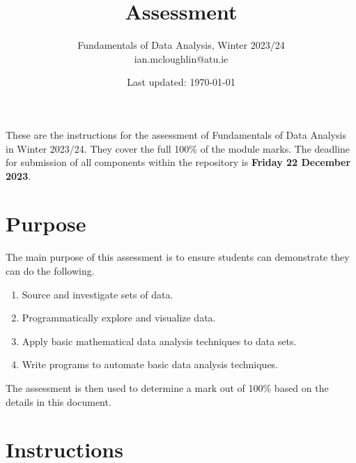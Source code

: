 \documentclass{iansnotes}
\title{Assessment}
\author{Fundamentals of Data Analysis, Winter 2023/24\\ian.mcloughlin@atu.ie}
\date{Last updated: \today}
\begin{document}
 
\maketitle

These are the instructions for the assessment of Fundamentals of Data Analysis in Winter 2023/24.
They cover the full 100\% of the module marks.
The deadline for submission of all components within the repository is \textbf{Friday 22 December 2023}.

\section{Purpose}
The main purpose of this assessment is to ensure students can demonstrate they can do the following.
\begin{enumerate}
  \item Source and investigate sets of data.
  \item Programmatically explore and visualize data.
  \item Apply basic mathematical data analysis techniques to data sets.
  \item Write programs to automate basic data analysis techniques.
\end{enumerate}
The assessment is then used to determine a mark out of 100\% based on the details in this document.


\section{Instructions}
\end{document}
